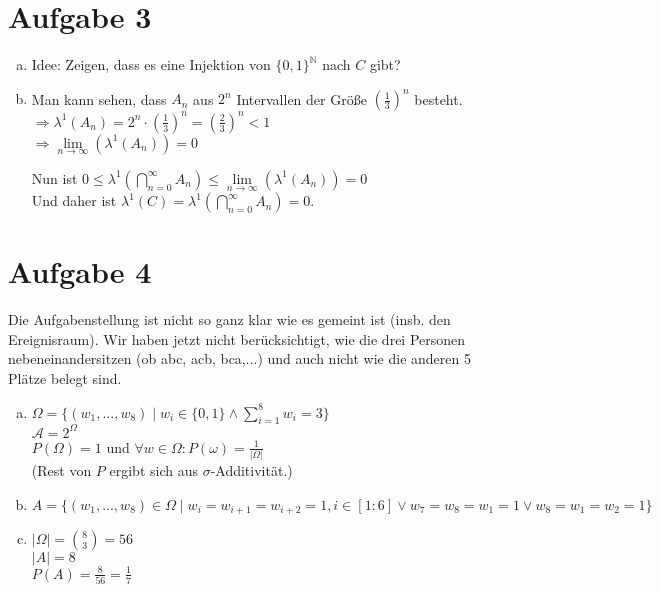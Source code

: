\documentclass[10pt,a4paper]{article}
\begin{document}
\section*{Aufgabe 3}
\begin{enumerate}[a)]
\item
Idee: Zeigen, dass es eine Injektion von $\{0,1\}^\mathbb{N}$ nach $C$ gibt?

\item
Man kann sehen, dass $A_n$ aus $2^n$ Intervallen der Größe $(\frac{1}{3})^n$ besteht.\\
$\Rightarrow \lambda ^1(A_n) = 2^n \cdot (\frac{1}{3})^n = (\frac{2}{3})^n < 1$\\
$\Rightarrow \lim \limits_{n\rightarrow \infty}(\lambda^1(A_n)) = 0$

Nun ist $0 \leq \lambda^1( \bigcap \limits_{n=0}^\infty A_n) \leq \lim \limits_{n\rightarrow \infty}(\lambda^1(A_n)) = 0$\\
Und daher ist $\lambda^1(C) = \lambda^1( \bigcap \limits_{n=0}^\infty A_n) = 0$.

\end{enumerate}
\newpage

\section*{Aufgabe 4}
Die Aufgabenstellung ist nicht so ganz klar wie es gemeint ist (insb. den Ereignisraum).
Wir haben jetzt nicht berücksichtigt, wie die drei Personen nebeneinandersitzen (ob abc, acb, bca,...)
und auch nicht wie die anderen 5 Plätze belegt sind.
\begin{enumerate}[a)]
\item
$\Omega = \{(w_1,...,w_8) \mid w_i \in \{0,1\} \land \sum \limits_{i=1}^8 w_i = 3\}$\\
$\mathcal{A} = 2^\Omega$\\
$P(\Omega)=1$ und $\forall w \in \Omega: P(\omega) = \frac{1}{|\Omega|}$ \\
(Rest von $P$ ergibt sich aus $\sigma$-Additivität.)
\item
$A =  \{(w_1,...,w_8) \in \Omega \mid w_i = w_{i+1} = w_{i+2} = 1, i \in [1:6] \lor w_7 = w_8 = w_1 = 1 \lor w_8 = w_1 = w_2 = 1\}$\\
\item
$|\Omega| = \binom{8}{3} = 56$\\
$|A|=8$ \\
$P(A) = \frac{8}{56} = \frac{1}{7}$
\end{enumerate}
\end{document}
